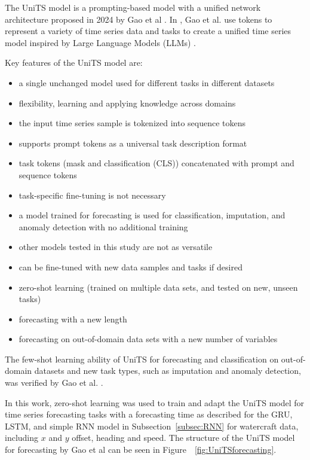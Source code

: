 \documentclass[preprint,12pt]{elsarticle}
\begin{document}
The UniTS model is a prompting-based model with a unified network architecture proposed in 2024 by Gao et al \citep{gao2024units}. In \citep{touvron2023llama}, Gao et al. \citep{gao2024units} use tokens to represent a variety of time series data and tasks to create a unified time series model inspired by Large Language Models (LLMs) \citep{touvron2023llama}. 

Key features of the UniTS model are:

\begin{itemize}
    \item a single unchanged model used for different tasks in different datasets
    \item flexibility, learning and applying knowledge across domains
    \item the input time series sample is tokenized into sequence tokens
    \item supports prompt tokens as a universal task description format
    \item task tokens (mask and classification (CLS)) concatenated with prompt and sequence tokens
    \item task-specific fine-tuning is not necessary
    \item a model trained for forecasting is used for classification, imputation, and anomaly detection with no additional training
    \item other models tested in this study are not as versatile
    \item can be fine-tuned with new data samples and tasks if desired
    \item zero-shot learning (trained on multiple data sets, and tested on new, unseen tasks)
    \item forecasting with a new length
    \item forecasting on out-of-domain data sets with a new number of variables
\end{itemize}

The few-shot learning ability of UniTS for forecasting and classification on out-of-domain datasets and new task types, such as imputation and anomaly detection, was verified by Gao et al. \citep{touvron2023llama, gao2024units}.

In this work, zero-shot learning was used to train and adapt the UniTS model for time series forecasting tasks with a forecasting time as described for the GRU, LSTM, and simple RNN model in Subsection~\ref{subsec:RNN} for watercraft data, including $x$ and $y$ offset, heading and speed. The structure of the UniTS model for forecasting by Gao et al \citep{gao2024units} can be seen in Figure~~\ref{fig:UniTSforecasting}.
\end{document}
